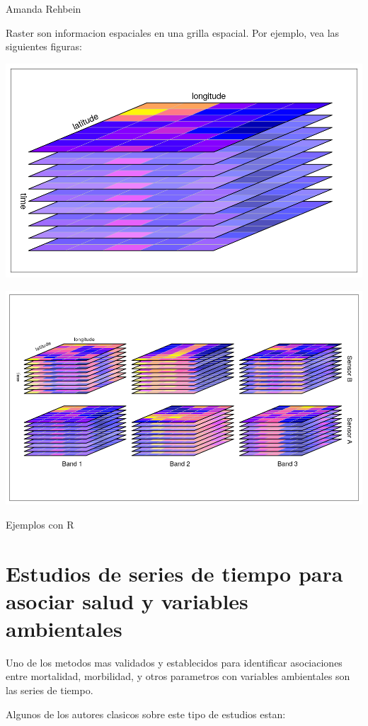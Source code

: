 \documentclass[]{book}
\begin{document}
Amanda Rehbein

Raster son informacion espaciales en una grilla espacial. Por ejemplo, vea las siguientes figuras:

\includegraphics{figs/cube1.png}

\includegraphics{figs/cube2.png}

Ejemplos con R

\hypertarget{estudios-de-series-de-tiempo-para-asociar-salud-y-variables-ambientales}{%
\chapter{Estudios de series de tiempo para asociar salud y variables ambientales}\label{estudios-de-series-de-tiempo-para-asociar-salud-y-variables-ambientales}}

Uno de los metodos mas validados y establecidos para identificar asociaciones entre mortalidad, morbilidad, y otros parametros con variables ambientales son las series de tiempo.

Algunos de los autores clasicos sobre este tipo de estudios estan:
\end{document}
